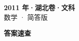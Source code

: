 \documentclass[zihao=-4, a4paper]{ctexart}
\begin{document}
\begin{center}
  {\Large\bfseries 2011 年·湖北卷·文科}\\[4pt]
  {\large 数学 · 简答版}
\end{center}
\medskip
{}

\clearpage
{}
\begin{center}{\Large\bfseries 答案速查}\end{center}
\medskip

\end{document}
